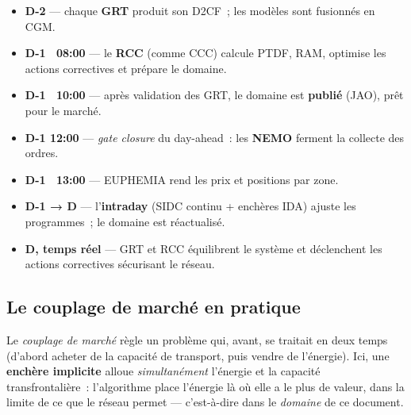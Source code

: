 \documentclass[11pt,a4paper]{article}
\begin{document}
\begin{itemize}[nosep,leftmargin=1.4em]
  \item \textbf{D-2} — chaque \textbf{GRT} produit son D2CF~; les modèles sont
        fusionnés en CGM.
  \item \textbf{D-1 ~08:00} — le \textbf{RCC} (comme CCC) calcule PTDF, RAM,
        optimise les actions correctives et prépare le domaine.
  \item \textbf{D-1 ~10:00} — après validation des GRT, le domaine est
        \textbf{publié} (JAO), prêt pour le marché.
  \item \textbf{D-1 12:00} — \emph{gate closure} du day-ahead~: les
        \textbf{NEMO} ferment la collecte des ordres.
  \item \textbf{D-1 ~13:00} — EUPHEMIA rend les prix et positions par zone.
  \item \textbf{D-1 → D} — l'\textbf{intraday} (SIDC continu + enchères IDA)
        ajuste les programmes~; le domaine est réactualisé.
  \item \textbf{D, temps réel} — GRT et RCC équilibrent le système et
        déclenchent les actions correctives sécurisant le réseau.
\end{itemize}

\subsection{Le couplage de marché en pratique}
\label{sec:couplagepratique}

Le \emph{couplage de marché} règle un problème qui, avant, se traitait en deux
temps (d'abord acheter de la capacité de transport, puis vendre de l'énergie).
Ici, une \textbf{enchère implicite} alloue \emph{simultanément} l'énergie et la
capacité transfrontalière~: l'algorithme place l'énergie là où elle a le plus
de valeur, dans la limite de ce que le réseau permet — c'est-à-dire dans le
\emph{domaine} de ce document.

\begin{center}
\end{center}
\end{document}
